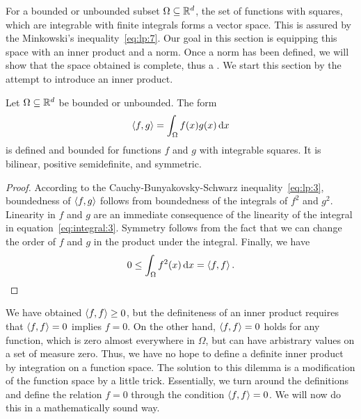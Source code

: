 \begin{intro}
  For a bounded or unbounded subset $\Omega\subseteq \mathbb R^d$, the set of
  functions with squares, which are integrable with finite integrals
  forms a vector space. This is assured by the Minkowski's
  inequality~\eqref{eq:lp:7}. Our goal in this section is equipping this
  space with an inner product and a norm. Once a norm has been
  defined, we will show that the space obtained is complete, thus a
  .
  We start this section by the attempt to introduce an inner
  product.
\end{intro}

\begin{lemma}
\label{lemma:lp:bilinear}
  Let $\Omega \subseteq \mathbb R^d$ be bounded or unbounded.
  The form
  \begin{gather}
    \label{eq:lp:4}
    \scal(f,g) = \int_\Omega f(x)g(x)\dx
  \end{gather}
  is defined and bounded for functions $f$ and $g$ with integrable
  squares. It is bilinear, positive semidefinite, and symmetric.
\end{lemma}

\begin{proof}
  According to the Cauchy-Bunyakovsky-Schwarz
  inequality~\eqref{eq:lp:3}, boundedness of $\scal(f,g)$ follows from
  boundedness of the integrals of $f^2$ and $g^2$.
  Linearity in $f$ and $g$ are an immediate consequence of the
  linearity of the integral in
  equation~\eqref{eq:integral:3}. Symmetry follows from the fact that
  we can change the order of $f$ and $g$ in the product under the
  integral. Finally, we have
  \begin{gather*}
    0 \le \int_\Omega f^2(x)\dx = \scal(f,f).
  \end{gather*}
\end{proof}

\begin{intro}
  We have obtained $\scal(f,f) \ge 0$, but the definiteness of an
  inner product requires that $\scal(f,f) = 0$ implies $f=0$. On the
  other hand, $\scal(f,f) = 0$ holds for any function, which is zero
  almost everywhere in $\Omega$, but can have arbistrary values on a
  set of measure zero. Thus, we have no hope to define a definite
  inner product by integration on a function space. The solution to
  this dilemma is a modification of the function space by a little
  trick. Essentially, we turn around the definitions and define the
  relation $f=0$ through the condition $\scal(f,f) = 0$. We will now
  do this in a mathematically sound way.
\end{intro}

